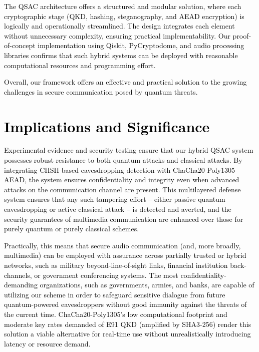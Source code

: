 \documentclass[a4paper]{cas-sc}
\begin{document}
\begin{itemize}
          \hspace{15pt}\textcolor{black}{The QSAC architecture offers a structured and modular solution, where each cryptographic stage (QKD, hashing, steganography, and AEAD encryption) is logically and operationally streamlined. The design integrates each element without unnecessary complexity, ensuring practical implementability. Our proof-of-concept implementation using Qiskit, PyCryptodome, and audio processing libraries confirms that such hybrid systems can be deployed with reasonable computational resources and programming effort.}
\end{itemize}

\textcolor{black}{Overall, our framework offers an effective and practical solution to the growing challenges in secure communication posed by quantum threats.}

\section{\textcolor{black}{Implications and Significance}}

\textcolor{black}{Experimental evidence and security testing ensure that our hybrid QSAC system possesses robust resistance to both quantum attacks and classical attacks. By integrating CHSH-based eavesdropping detection with ChaCha20‑Poly1305 AEAD, the system ensures confidentiality and integrity even when advanced attacks on the communication channel are present. This multilayered defense system ensures that any such tampering effort -- either passive quantum eavesdropping or active classical attack -- is detected and averted, and the security guarantees of multimedia communication are enhanced over those for purely quantum or purely classical schemes.}

\textcolor{black}{Practically, this means that secure audio communication (and, more broadly, multimedia) can be employed with assurance across partially trusted or hybrid networks, such as military beyond-line-of-sight links, financial institution back-channels, or government conferencing systems. The most confidentiality-demanding organizations, such as governments, armies, and banks, are capable of utilizing our scheme in order to safeguard sensitive dialogue from future quantum-powered eavesdroppers without good immunity against the threats of the current time. ChaCha20-Poly1305's low computational footprint and moderate key rates demanded of E91 QKD (amplified by SHA3-256) render this solution a viable alternative for real-time use without unrealistically introducing latency or resource demand.}
\end{document}
